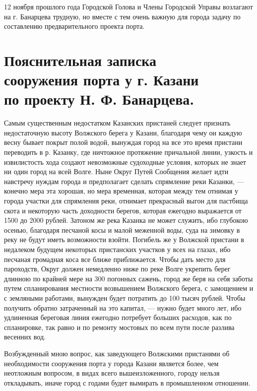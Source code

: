 \documentclass[oneside,final,14pt]{extreport}
\begin{document}
	12 ноября прошлого года Городской Голова и Члены Городской Управы возлагают на г. Банарцева трудную, но вместе с тем очень важную для города задачу по составлению предварительного проекта порта.
	
	\newpage
	
	{%
		\centering
		\section*{Пояснительная записка \\сооружения порта у г. Казани\\по проекту Н. Ф. Банарцева.}
	}
	
	Самым существенным недостатком Казанских пристаней следует признать недостаточную высоту Волжского берега у Казани, благодаря чему он каждую весну бывает покрыт полой водой, вынуждая город на все это время пристани переводить в р. Казанку, где ничтожное протяжение причальной линии, узкость и извилистость хода создают невозможные судоходные условия, которых не знает ни один город на всей Волге. Ныне Округ Путей Сообщения желает идти навстречу нуждам города и предполагает сделать спрямление реки Казанки, — конечно мера эта хорошая, но мера временная, которая между тем отнимая у города участки для спрямления реки, отнимает прекрасный выгон для пастбища скота и некоторую часть доходности берегов, которая ежегодно выражается от 1500 до 2000 рублей. Затоном же река Казанка не может служить, ибо глубокою осенью, благодаря песчаной косы и малой меженной воды, суда на зимовку в реку не будут иметь возможности взойти. Погибель же у Волжской пристани в недалеком будущем некоторых пристанских участков у всех на глазах, ибо песчаная громадная коса все ближе приближается. Чтобы дать место для пароходств, Округ должен немедленно ниже по реке Волге укрепить берег длинною по крайней мере на 300 погонных сажень, город же беря на себя заботы путем спланирования местности возвышением Волжского берега, с замощением и с земляными работами, вынужден будет потратить до 100 тысяч рублей. Чтобы получить обратно затраченный на это капитал, — нужно будет много лет, ибо удлиненная береговая линия ежегодно потребует больших расходов, как по спланировке, так равно и по ремонту мостовых по всем пути после разлива весенних вод.
	
	Возбужденный мною вопрос, как заведующего Волжскими пристанями об необходимости сооружения порта у города Казани является более, чем неотложным вопросом, в видах всего вышеизложенного, городу нельзя откладывать, иначе город с годами будет вымирать в промышленном отношении.
	
\end{document}

